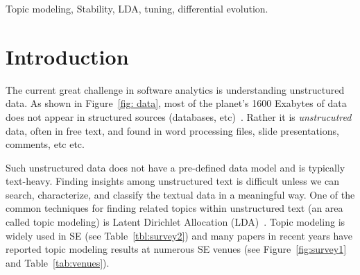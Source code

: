 \documentclass[10pt,conference]{IEEEtran}
\theoremstyle{break}
\begin{document}
\begin{IEEEkeywords}
Topic modeling, Stability, LDA, tuning, differential evolution.
\end{IEEEkeywords}
 

\section{Introduction}
\label{sect: intro}
The current great challenge in software analytics is understanding unstructured data. As shown in Figure~\ref{fig: data}, most of the planet's 1600 Exabytes of data does not appear in structured sources (databases, etc)~\cite{nadkarni2014structured}. Rather
it is {\em unstrucutred} data, often in free text, and found in word processing
files, slide presentations, comments, etc etc. 

Such unstructured data does not have a pre-defined data model and is typically text-heavy. Finding insights among unstructured text is  difficult unless we can search, characterize, and classify the textual data in a meaningful way. One of the common techniques for finding related topics within unstructured text (an area called topic modeling) is Latent Dirichlet Allocation (LDA)~\cite{blei2003latent}.
Topic modeling is widely used in SE (see Table~\ref{tbl:survey2})
and many papers in recent years have reported  topic modeling results at numerous SE venues (see Figure~\ref{fig:survey1} and Table~\ref{tab:venues}).



\end{document}
